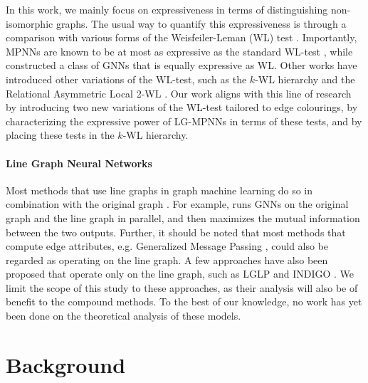 \documentclass{article}
\begin{document}
In this work, we mainly focus on expressiveness in terms of distinguishing non-isomorphic graphs.
The usual way to quantify this expressiveness is through a comparison with various forms of the Weisfeiler-Leman (WL) test \cite{weisfeiler1968reduction}. Importantly, MPNNs are known to be at most as expressive as the standard WL-test \cite{morris2019weisfeiler}, while \cite{xu2018powerful} constructed a class of GNNs that is equally expressive as WL. Other works have introduced other variations of the WL-test, such as the $k$-WL hierarchy \cite{morris2019weisfeiler} and the Relational Asymmetric Local 2-WL \cite{huang2024theory}.
Our work aligns with this line of research by introducing two new variations of the WL-test tailored to edge colourings, by characterizing the expressive power of LG-MPNNs in terms of these tests, and by placing these tests in the $k$-WL hierarchy.



\paragraph{Line Graph Neural Networks}
Most methods that use line graphs in graph machine learning do so in combination with the original graph \cite{choudhary2021atomistic,chen2017supervised,jiang2019censnet,zhang2023line}. For example, \cite{zhang2023line} runs GNNs on the original graph and the line graph in parallel, and then maximizes the mutual information between the two outputs.
Further, it should be noted that most methods that compute edge attributes, e.g. 
Generalized Message Passing \cite{battaglia2018relational}, could also be regarded as operating on the line graph.
A few approaches have also been proposed that operate only on the line graph, such as LGLP \cite{cai2021line} and INDIGO \cite{liu2021indigo}.
We limit the scope of this study to these approaches, as their analysis will also be of benefit to the compound methods. To the best of our knowledge, no work has yet been done on the theoretical analysis of these models.



\section{Background}    \label{sec:background}
\end{document}
